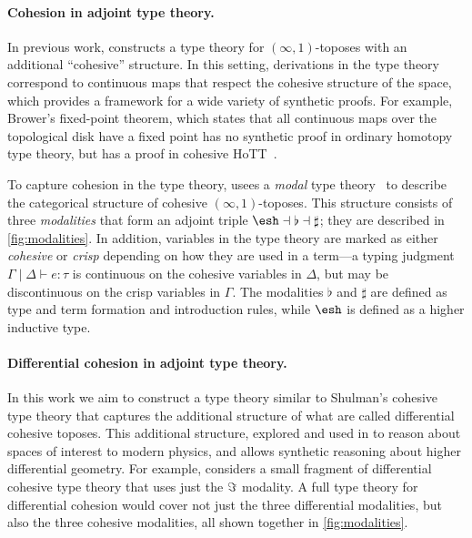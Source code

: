 \documentclass{article}
\begin{document}
\paragraph{Cohesion in adjoint type theory.}

In previous work, \citet{Shulman2015} constructs a type theory for
$(\infty,1)$-toposes with an additional ``cohesive'' structure. In this setting,
derivations in the type theory correspond to continuous maps that respect the
cohesive structure of the space, which provides a framework for a wide variety
of synthetic proofs. For example, Brower's fixed-point theorem, which states
that all continuous maps over the topological disk have a fixed point has no
synthetic proof in ordinary homotopy type theory, but has a proof in cohesive
HoTT~\citep{Shulman2015}.

To capture cohesion in the type theory, \citet{Shulman2015} usees a \emph{modal}
type theory~\citep{Pfenning2001} to describe the categorical structure of
cohesive $(\infty,1)$-toposes. This structure consists of three
\emph{modalities}  that form an adjoint triple
$\shape \dashv \flat \dashv \sharp$; they are described in
\cref{fig:modalities}. In addition, variables in the type theory are marked as
either \emph{cohesive} or \emph{crisp} depending on how they are used in a
term---a typing judgment $\Gamma \mid \Delta \vdash e : \tau$ is continuous on
the cohesive variables in $\Delta$, but may be discontinuous on the crisp
variables in $\Gamma$. The modalities $\flat$ and $\sharp$ are defined as type
and term formation and introduction rules, while $\shape$ is defined as a higher
inductive type.


\paragraph{Differential cohesion in adjoint type theory.}

In this work we aim to construct a type theory similar to Shulman's cohesive
type theory that captures the additional structure of what are called
differential cohesive toposes.  This additional structure, explored and used in
\citet{Schreiber2013} to reason about spaces of interest to modern physics, and
allows synthetic reasoning about higher differential geometry. For example,
\citeauthor{Wellen2017} considers a small fragment of differential cohesive type
theory that uses just the $\Im$ modality. A full type theory for differential
cohesion would cover not just the three differential modalities, but also the
three cohesive modalities, all shown together in \cref{fig:modalities}.
\end{document}
